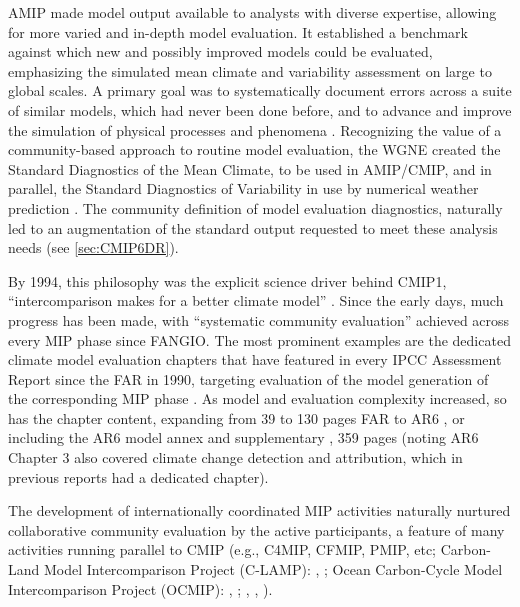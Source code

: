 \documentclass[manuscript]{copernicus}
\begin{document}
AMIP made model output available to analysts with diverse expertise, allowing for more varied and in-depth model evaluation. It established a benchmark against which new and possibly improved models could be evaluated, emphasizing the simulated mean climate and variability assessment on large to global scales. A primary goal was to systematically document errors across a suite of similar models, which had never been done before, and to advance and improve the simulation of physical processes and phenomena \citep{gates_ams_1992}. Recognizing the value of a community-based approach to routine model evaluation, the WGNE created the Standard Diagnostics of the Mean Climate, to be used in AMIP/CMIP, and in parallel, the Standard Diagnostics of Variability in use by numerical weather prediction \citep[e.g.,][p. 10]{wmo_world_climate_research_programme_report_2003}. The community definition of model evaluation diagnostics, naturally led to an augmentation of the standard output requested to meet these analysis needs (see \autoref{sec:CMIP6DR}).

By 1994, this philosophy was the explicit science driver behind CMIP1, ``intercomparison makes for a better climate model'' \citep{meehl_intercomparison_1997}. Since the early days, much progress has been made, with ``systematic community evaluation'' achieved across every MIP phase since FANGIO. The most prominent examples are the dedicated climate model evaluation chapters that have featured in every IPCC Assessment Report since the FAR in 1990, targeting evaluation of the model generation of the corresponding MIP phase \citep[e.g.,][]{gates_validation_1990,gates_climate_1996,mcavaney_model_2001,randall_climate_2007,flato_evaluation_2013,eyring_human_2021}. As model and evaluation complexity increased, so has the chapter content, expanding from 39 to 130 pages FAR to AR6 \citep{gates_validation_1990,eyring_human_2021}, or including the AR6 model annex \citep{gutierrez_models_2021} and supplementary \citep{eyring_human_2021-1}, 359 pages (noting AR6 Chapter 3 also covered climate change detection and attribution, which in previous reports had a dedicated chapter).

The development of internationally coordinated MIP activities naturally nurtured collaborative community evaluation by the active participants, a feature of many activities running parallel to CMIP (e.g., C4MIP, CFMIP, PMIP, etc; Carbon-Land Model Intercomparison Project (C-LAMP): \citeauthor{hoffman_results_2007}, \citeyear{hoffman_results_2007}; Ocean Carbon-Cycle Model Intercomparison Project (OCMIP): \citeauthor{orr_ocean_1999}, \citeyear{orr_ocean_1999}; \citeauthor{dutay_evaluation_2002}, \citeyear{dutay_evaluation_2002}, \citeyear{dutay_evaluation_2004}).
\end{document}
